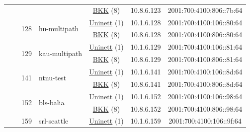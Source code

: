 \begin{small}
\begin{center}
\begin{longtable}{|c|c|c|c|c|c|c|c|}
  &  &  &  & \multicolumn{2}{|c|}{\tiny{\href{http://bkk.no}{BKK} (8)}} & \tiny{10.8.6.123} & \tiny{2001:700:4100:806::7b:64} \\* \cline{3-3}\cline{4-4}\cline{5-5}\cline{6-6}\cline{7-7}\cline{8-8}
  &  & \multirow{2}{*}{\tiny{128}} & \multicolumn{1}{|l|}{\multirow{2}{*}{\tiny{hu-multipath}}} & \multicolumn{2}{|c|}{\tiny{\href{https://www.uninett.no}{Uninett} (1)}} & \tiny{10.1.6.128} & \tiny{2001:700:4100:106::80:64} \\* \cline{5-5}\cline{6-6}\cline{7-7}\cline{8-8}
  &  &  &  & \multicolumn{2}{|c|}{\tiny{\href{http://bkk.no}{BKK} (8)}} & \tiny{10.8.6.128} & \tiny{2001:700:4100:806::80:64} \\* \cline{3-3}\cline{4-4}\cline{5-5}\cline{6-6}\cline{7-7}\cline{8-8}
  &  & \multirow{2}{*}{\tiny{129}} & \multicolumn{1}{|l|}{\multirow{2}{*}{\tiny{kau-multipath}}} & \multicolumn{2}{|c|}{\tiny{\href{https://www.uninett.no}{Uninett} (1)}} & \tiny{10.1.6.129} & \tiny{2001:700:4100:106::81:64} \\* \cline{5-5}\cline{6-6}\cline{7-7}\cline{8-8}
  &  &  &  & \multicolumn{2}{|c|}{\tiny{\href{http://bkk.no}{BKK} (8)}} & \tiny{10.8.6.129} & \tiny{2001:700:4100:806::81:64} \\* \cline{3-3}\cline{4-4}\cline{5-5}\cline{6-6}\cline{7-7}\cline{8-8}
  &  & \multirow{2}{*}{\tiny{141}} & \multicolumn{1}{|l|}{\multirow{2}{*}{\tiny{ntnu-test}}} & \multicolumn{2}{|c|}{\tiny{\href{https://www.uninett.no}{Uninett} (1)}} & \tiny{10.1.6.141} & \tiny{2001:700:4100:106::8d:64} \\* \cline{5-5}\cline{6-6}\cline{7-7}\cline{8-8}
  &  &  &  & \multicolumn{2}{|c|}{\tiny{\href{http://bkk.no}{BKK} (8)}} & \tiny{10.8.6.141} & \tiny{2001:700:4100:806::8d:64} \\* \cline{3-3}\cline{4-4}\cline{5-5}\cline{6-6}\cline{7-7}\cline{8-8}
  &  & \multirow{2}{*}{\tiny{152}} & \multicolumn{1}{|l|}{\multirow{2}{*}{\tiny{bls-balia}}} & \multicolumn{2}{|c|}{\tiny{\href{https://www.uninett.no}{Uninett} (1)}} & \tiny{10.1.6.152} & \tiny{2001:700:4100:106::98:64} \\* \cline{5-5}\cline{6-6}\cline{7-7}\cline{8-8}
  &  &  &  & \multicolumn{2}{|c|}{\tiny{\href{http://bkk.no}{BKK} (8)}} & \tiny{10.8.6.152} & \tiny{2001:700:4100:806::98:64} \\* \cline{3-3}\cline{4-4}\cline{5-5}\cline{6-6}\cline{7-7}\cline{8-8}
  &  & \multirow{2}{*}{\tiny{159}} & \multicolumn{1}{|l|}{\multirow{2}{*}{\tiny{srl-seattle}}} & \multicolumn{2}{|c|}{\tiny{\href{https://www.uninett.no}{Uninett} (1)}} & \tiny{10.1.6.159} & \tiny{2001:700:4100:106::9f:64} \\* \cline{5-5}\cline{6-6}\cline{7-7}\cline{8-8}

\end{longtable}
\end{center}
\end{small}
